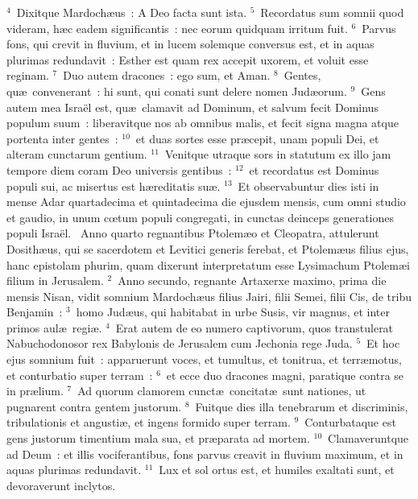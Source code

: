 ${}^{4}$~Dixitque Mardoch\ae us~: A Deo facta sunt ista.
${}^{5}$~Recordatus sum somnii quod videram, h\ae c eadem significantis~: nec eorum quidquam irritum fuit.
${}^{6}$~Parvus fons, qui crevit in fluvium, et in lucem solemque conversus est, et in aquas plurimas redundavit~: Esther est quam rex accepit uxorem, et voluit esse reginam.
${}^{7}$~Duo autem dracones~: ego sum, et Aman.
${}^{8}$~Gentes, qu\ae\ convenerant~: hi sunt, qui conati sunt delere nomen Jud\ae orum.
${}^{9}$~Gens autem mea Isra\"el est, qu\ae\ clamavit ad Dominum, et salvum fecit Dominus populum suum~: liberavitque nos ab omnibus malis, et fecit signa magna atque portenta inter gentes~:
${}^{10}$~et duas sortes esse pr\ae cepit, unam populi Dei, et alteram cunctarum gentium.
${}^{11}$~Venitque utraque sors in statutum ex illo jam tempore diem coram Deo universis gentibus~:
${}^{12}$~et recordatus est Dominus populi sui, ac misertus est h\ae reditatis su\ae .
${}^{13}$~Et observabuntur dies isti in mense Adar quartadecima et quintadecima die ejusdem mensis, cum omni studio et gaudio, in unum cœtum populi congregati, in cunctas deinceps generationes populi Isra\"el.
~\lettrine[lines=10,image=true,loversize=0.05,lraise=-0.03]{A}{}nno quarto regnantibus Ptolem\ae o et Cleopatra, attulerunt Dosith\ae us, qui se sacerdotem et Levitici generis ferebat, et Ptolem\ae us filius ejus, hanc epistolam phurim, quam dixerunt interpretatum esse Lysimachum Ptolem\ae i filium in Jerusalem.
${}^{2}$~Anno secundo, regnante Artaxerxe maximo, prima die mensis Nisan, vidit somnium Mardoch\ae us filius Jairi, filii Semei, filii Cis, de tribu Benjamin~:
${}^{3}$~homo Jud\ae us, qui habitabat in urbe Susis, vir magnus, et inter primos aul\ae\ regi\ae .
${}^{4}$~Erat autem de eo numero captivorum, quos transtulerat Nabuchodonosor rex Babylonis de Jerusalem cum Jechonia rege Juda.
${}^{5}$~Et hoc ejus somnium fuit~: apparuerunt voces, et tumultus, et tonitrua, et terr\ae motus, et conturbatio super terram~:
${}^{6}$~et ecce duo dracones magni, paratique contra se in pr\ae lium.
${}^{7}$~Ad quorum clamorem cunct\ae\ concitat\ae\ sunt nationes, ut pugnarent contra gentem justorum.
${}^{8}$~Fuitque dies illa tenebrarum et discriminis, tribulationis et angusti\ae , et ingens formido super terram.
${}^{9}$~Conturbataque est gens justorum timentium mala sua, et pr\ae parata ad mortem.
${}^{10}$~Clamaveruntque ad Deum~: et illis vociferantibus, fons parvus creavit in fluvium maximum, et in aquas plurimas redundavit.
${}^{11}$~Lux et sol ortus est, et humiles exaltati sunt, et devoraverunt inclytos.
